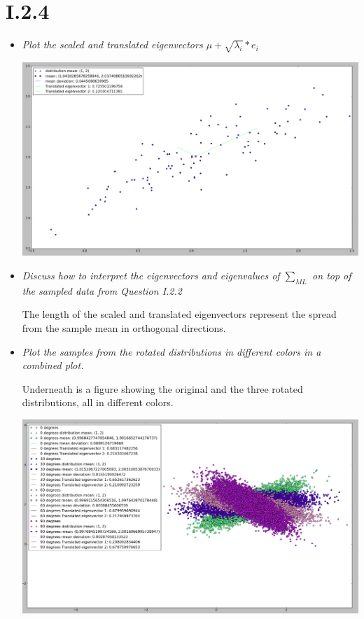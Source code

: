 \documentclass[12pt, a4paper]{article}
\begin{document}
\section{I.2.4}
\begin{itemize}
\item \textit{Plot the scaled and translated eigenvectors
$\mu + \sqrt{\lambda_i} * e_i$}

\includegraphics[width=\textwidth]{5.png}

\item \textit{Discuss how to interpret the
eigenvectors and eigenvalues of $\sum _{ML} $
on top of the sampled data from Question I.2.2}

The length of the scaled and translated eigenvectors represent the spread from the sample mean in orthogonal directions. 

\item \textit{Plot the samples from the rotated distributions in different colors in a combined plot.}

Underneath is a figure showing the original and the three rotated distributions, all in different colors.

\includegraphics[width=\textwidth]{6.png}


\end{itemize}
\end{document}
